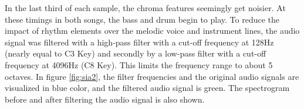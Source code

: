\noindent In the last third of each sample, the chroma features seemingly get noisier. At these timings in both songs, the bass and drum begin to play. To reduce the impact of rhythm elements over the melodic voice and instrument lines, the audio signal was filtered with a high-pass filter with a cut-off frequency at 128Hz (nearly equal to C3 Key) and secondly by a low-pass filter with a cut-off frequency at 4096Hz (C8 Key). This limits the frequency range to about 5 octaves. 
In figure \ref{fig:sia2}, the filter frequencies and the original audio signals are visualized in blue color, and the filtered audio signal is green. The spectrogram before and after filtering the audio signal is also shown. 
\begin{figure}[htbp]
	\centering
\end{figure}
